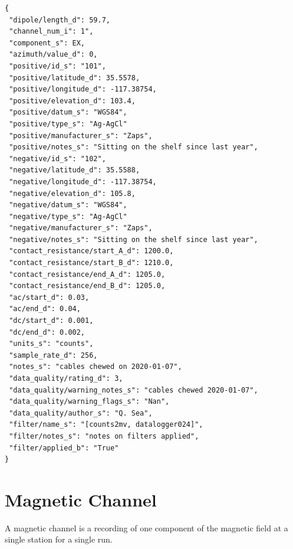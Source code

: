 \documentclass{article}
\begin{document}
\begin{verbatim}
{
 "dipole/length_d": 59.7,
 "channel_num_i": 1",
 "component_s": EX,
 "azimuth/value_d": 0,
 "positive/id_s": "101",
 "positive/latitude_d": 35.5578,
 "positive/longitude_d": -117.38754,
 "positive/elevation_d": 103.4,
 "positive/datum_s": "WGS84",
 "positive/type_s": "Ag-AgCl"
 "positive/manufacturer_s": "Zaps",
 "positive/notes_s": "Sitting on the shelf since last year",
 "negative/id_s": "102",
 "negative/latitude_d": 35.5588,
 "negative/longitude_d": -117.38754,
 "negative/elevation_d": 105.8,
 "negative/datum_s": "WGS84",
 "negative/type_s": "Ag-AgCl"
 "negative/manufacturer_s": "Zaps",
 "negative/notes_s": "Sitting on the shelf since last year",
 "contact_resistance/start_A_d": 1200.0,
 "contact_resistance/start_B_d": 1210.0,
 "contact_resistance/end_A_d": 1205.0,
 "contact_resistance/end_B_d": 1205.0,
 "ac/start_d": 0.03,
 "ac/end_d": 0.04,
 "dc/start_d": 0.001,
 "dc/end_d": 0.002,
 "units_s": "counts",
 "sample_rate_d": 256,
 "notes_s": "cables chewed on 2020-01-07",
 "data_quality/rating_d": 3,
 "data_quality/warning_notes_s": "cables chewed 2020-01-07",
 "data_quality/warning_flags_s": "Nan",
 "data_quality/author_s": "Q. Sea",
 "filter/name_s": "[counts2mv, datalogger024]",
 "filter/notes_s": "notes on filters applied",
 "filter/applied_b": "True"
}
\end{verbatim}

\newpage
\section{Magnetic Channel}

A magnetic channel is a recording of one component of the magnetic field at a single station for a single run.
\end{document}
